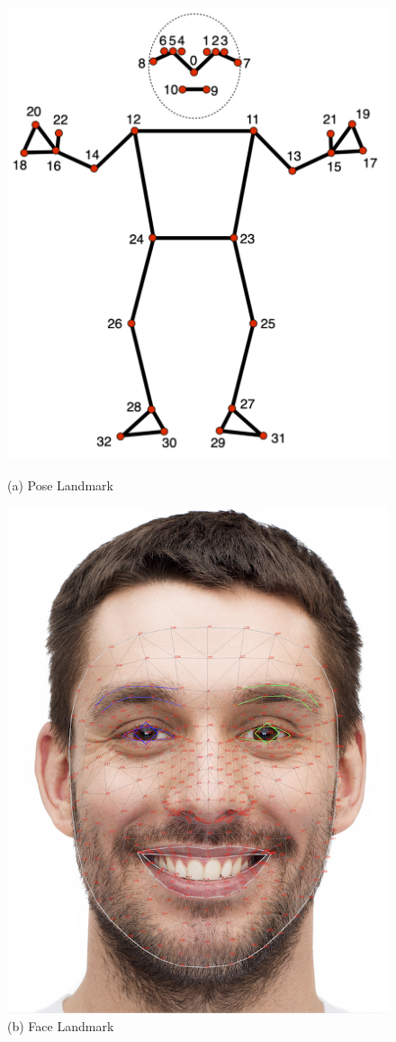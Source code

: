 \documentclass{article}
\begin{document}
\begin{figure}[htpb]
    \centering
    \begin{minipage}[b]{0.32\textwidth}
        \centering
        \includegraphics[width=0.75\linewidth]{Fig/pose_landmarks_index.png}
        \caption{(a) Pose Landmark}
    \end{minipage}
    \hspace{1cm}
    \begin{minipage}[b]{0.32\textwidth}
        \centering
        \includegraphics[width=0.75\linewidth]{Fig/face_landmarker_keypoints.png}
        \caption{(b) Face Landmark}
    \end{minipage}
    \label{fig:mediapipe1}
\end{figure}
\end{document}
